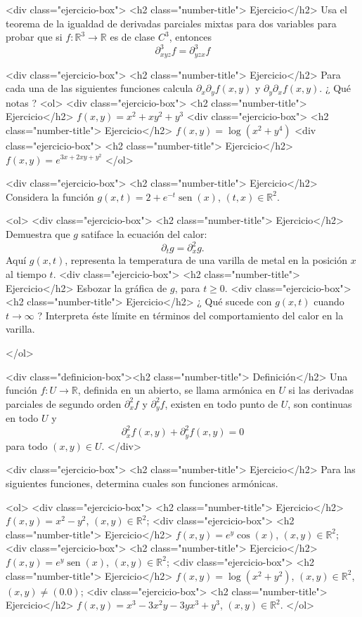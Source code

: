 \documentclass{article}
\theoremstyle{definition}
\newcommand{\sen}{\operatorname{sen}}
\begin{document}
      <div class="ejercicio-box"> <h2 class="number-title"> Ejercicio</h2> Usa el teorema de la igualdad de derivadas parciales mixtas
    para dos variables para probar que si $f:\mathbb{R}^3\to \mathbb{R}$
    es de clase $C^3$, entonces
    $$
    \partial^{3}_{xyz}f=\partial_{yzx}^3 f
    $$


    
    <div class="ejercicio-box"> <h2 class="number-title"> Ejercicio</h2> Para cada una de las siguientes funciones
    calcula $\partial_{x}\partial_yf(x,y)$ y $\partial_y\partial_xf(x,y)$.
    ¿ Qué notas ?
    <ol>
    <div class="ejercicio-box"> <h2 class="number-title"> Ejercicio</h2> $f(x,y)=x^2+xy^2+y^3$
    <div class="ejercicio-box"> <h2 class="number-title"> Ejercicio</h2> $f(x,y)=\log(x^2+y^4)$
    <div class="ejercicio-box"> <h2 class="number-title"> Ejercicio</h2> $f(x,y)=e^{3x+2xy+y^2}$                 
    </ol>

    
  <div class="ejercicio-box"> <h2 class="number-title"> Ejercicio</h2> Considera  la función $g(x,t)=2+e^{-t}\sen(x)$,
    $(t,x)\in \mathbb{R}^2$.

    <ol>
    <div class="ejercicio-box"> <h2 class="number-title"> Ejercicio</h2> Demuestra que $g$ satiface la
      ecuación del calor:
      $$
      \partial_t g= \partial_x^2g.
      $$
      Aquí $g(x,t)$, representa la temperatura de una varilla de metal
      en la posición $x$ al tiempo $t$.
    <div class="ejercicio-box"> <h2 class="number-title"> Ejercicio</h2> Esbozar la gráfica de $g$, para $t\geq 0$.
    <div class="ejercicio-box"> <h2 class="number-title"> Ejercicio</h2> ¿ Qué sucede con $g(x,t)$ cuando $t\to \infty$ ?
    Interpreta éste límite en términos del comportamiento del calor
    en la varilla.

  </ol>
  

    <div class="definicion-box"><h2 class="number-title">  Definición</h2>
      Una función $f:U\to \mathbb{R}$, definida en un abierto,
      se llama armónica en $U$ si las
      derivadas parciales de segundo orden $\partial_x^2 f$ y $\partial_y^2 f$,
      existen en todo punto de $U$, son continuas en todo $U$ y
       $$
       \partial_x^2f(x,y)+\partial_y^2f(x,y)=0
       $$ 
       para todo $(x,y)\in U$. 
     </div>

  <div class="ejercicio-box"> <h2 class="number-title"> Ejercicio</h2>  Para las siguientes funciones,
    determina cuales son funciones armónicas. 

       
    <ol>
    <div class="ejercicio-box"> <h2 class="number-title"> Ejercicio</h2> $f(x,y)=x^2-y^2$, $(x,y)\in \mathbb{R}^2$;
    <div class="ejercicio-box"> <h2 class="number-title"> Ejercicio</h2> $f(x,y)=e^y\cos(x)$, $(x,y)\in \mathbb{R}^2$; 
    <div class="ejercicio-box"> <h2 class="number-title"> Ejercicio</h2> $f(x,y)=e^y\sen(x)$, $(x,y)\in \mathbb{R}^2$;
    <div class="ejercicio-box"> <h2 class="number-title"> Ejercicio</h2> $f(x,y)=\log(x^2+y^2)$,
      $(x,y)\in \mathbb{R}^2$, $(x,y)\ne (0.0)$;
    <div class="ejercicio-box"> <h2 class="number-title"> Ejercicio</h2> $f(x,y)=x^3-3x^2y-3yx^3+y^3$, $(x,y)\in \mathbb{R}^2$.
    </ol>		       
\end{document}
